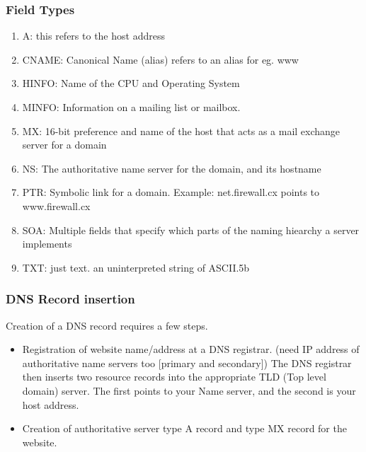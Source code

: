 \documentclass{article}
\begin{document}
\subsubsection{Field Types}
\begin{enumerate}
    \item A: this refers to the host address
    \item CNAME: Canonical Name (alias) refers to an alias for eg. www
    \item HINFO: Name of the CPU and Operating System
    \item MINFO: Information on a mailing list or mailbox.
    \item MX: 16-bit preference and name of the host that acts as a mail exchange server for a domain
    \item NS: The authoritative name server for the domain, and its hostname
    \item PTR: Symbolic link for a domain. Example: net.firewall.cx points to www.firewall.cx
    \item SOA: Multiple fields that specify which parts of the naming hiearchy a server implements
    \item TXT: just text. an uninterpreted string of ASCII.5b
\end{enumerate}
\subsubsection{DNS Record insertion}
Creation of a DNS record requires a few steps.
\begin{itemize}
    \item Registration of website name/address at a DNS registrar. (need IP address of authoritative name servers too [primary and secondary]) The DNS registrar then inserts two resource records into the appropriate TLD (Top level domain) server. The first points to your Name server, and the second is your host address.
    \item Creation of authoritative server type A record and type MX record for the website.
\end{itemize}
\end{document}

